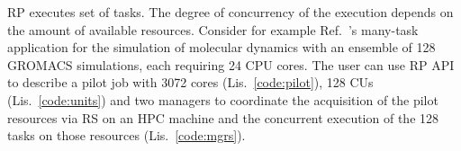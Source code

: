 \documentclass[preprint,12pt, a4paper]{elsarticle}
\begin{document}
RP executes set of tasks. The degree of concurrency of the execution depends
on the amount of available resources. Consider for example
Ref.~\cite{balasubramanian2016extasy}'s many-task application for the
simulation of molecular dynamics with an ensemble of 128 GROMACS simulations,
each requiring 24 CPU cores. The user can use RP API to describe a pilot job
with 3072 cores (Lis.~\ref{code:pilot}), 128 CUs (Lis.~\ref{code:units}) and
two managers to coordinate the acquisition of the pilot resources via RS on
an HPC machine and the concurrent execution of the 128 tasks on those
resources (Lis.~\ref{code:mgrs}).


\end{document}
